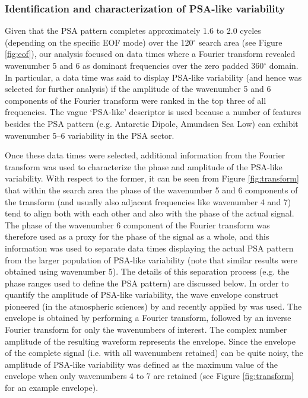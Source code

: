 \subsubsection{Identification and characterization of PSA-like variability}

Given that the PSA pattern completes approximately 1.6 to 2.0 cycles (depending on the specific EOF mode) over the 120$^{\circ}$ search area (see Figure \ref{fig:eof}), our analysis focused on data times where a Fourier transform revealed wavenumber 5 and 6 as dominant frequencies over the zero padded 360$^{\circ}$ domain. In particular, a data time was said to display PSA-like variability (and hence was selected for further analysis) if the amplitude of the wavenumber 5 and 6 components of the Fourier transform were ranked in the top three of all frequencies. The vague `PSA-like' descriptor is used because a number of features besides the PSA pattern (e.g. Antarctic Dipole, Amundsen Sea Low) can exhibit wavenumber 5--6 variability in the PSA sector.

Once these data times were selected, additional information from the Fourier transform was used to characterize the phase and amplitude of the PSA-like variability. With respect to the former, it can be seen from Figure \ref{fig:transform} that within the search area the phase of the wavenumber 5 and 6 components of the transform (and usually also adjacent frequencies like wavenumber 4 and 7) tend to align both with each other and also with the phase of the actual signal. The phase of the wavenumber 6 component of the Fourier transform was therefore used as a proxy for the phase of the signal as a whole, and this information was used to separate data times displaying the actual PSA pattern from the larger population of PSA-like variability (note that similar results were obtained using wavenumber 5). The details of this separation process (e.g. the phase ranges used to define the PSA pattern) are discussed below. In order to quantify the amplitude of PSA-like variability, the wave envelope construct pioneered (in the atmospheric sciences) by \citet{Zimin2003} and recently applied by \citet{IrvingSimmonds2015} was used. The envelope is obtained by performing a Fourier transform, followed by an inverse Fourier transform for only the wavenumbers of interest. The complex number amplitude of the resulting waveform represents the envelope. Since the envelope of the complete signal (i.e. with all wavenumbers retained) can be quite noisy, the amplitude of PSA-like variability was defined as the maximum value of the envelope when only wavenumbers 4 to 7 are retained (see Figure \ref{fig:transform} for an example envelope).

